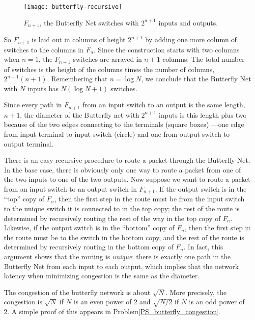 \begin{figure}
\texttt{[image: butterfly-recursive]}
\caption{$F_{n+1}$, the Butterfly Net switches with $2^{n+1}$ inputs
and outputs.}
\label{fig:butterfly-recursive}
\end{figure}

So $F_{n+1}$ is laid out in columns of height $2^{n+1}$ by adding one more
column of switches to the columns in $F_n$.  Since the construction starts
with two columns when $n=1$, the $F_{n+1}$ switches are arrayed in $n+1$
columns.  The total number of switches is the height of the columns times
the number of columns, $2^{n+1}(n+1)$.  Remembering that $n=\log
N$, we conclude that the Butterfly Net with $N$ inputs has $N(\log N +1)$
switches.

Since every path in $F_{n+1}$ from an input switch to an output is the
same length, $n+1$, the diameter of the Butterfly net with
$2^{n+1}$ inputs is this length plus two because of the two edges
connecting to the terminals (square boxes) ---one edge from input
terminal to input switch (circle) and one from output switch to output
terminal.

There is an easy recursive procedure to route a packet through the
Butterfly Net.  In the base case, there is obviously only one way to route
a packet from one of the two inputs to one of the two outputs.  Now
suppose we want to route a packet from an input switch to an output switch
in $F_{n+1}$.  If the output switch is in the ``top'' copy of $F_n$, then
the first step in the route must be from the input switch to the unique
switch it is connected to in the top copy; the rest of the route is
determined by recursively routing the rest of the way in the top copy of
$F_n$.  Likewise, if the output switch is in the ``bottom'' copy of $F_n$,
then the first step in the route must be to the switch in the bottom copy,
and the rest of the route is determined by recursively routing in the
bottom copy of $F_n$.  In fact, this argument shows that the routing is
\emph{unique}: there is exactly one path in the Butterfly Net from each
input to each output, which implies that the network latency when
minimizing congestion is the same as the diameter.

The congestion of the butterfly network is about $\sqrt{N}$.  More
precisely, the congestion is $\sqrt{N}$ if $N$ is an even power of 2 and
$\sqrt{N/2}$ if $N$ is an odd power of 2.  A simple proof of this appears
in Problem\ref{PS_butterfly_congestion}.

